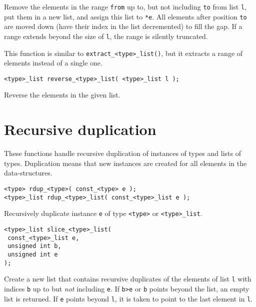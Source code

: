 \begin{desc}
Remove the elements in the range {\tt from} up to, but not including {\tt to} from list {\tt l},
put them in a new list, and assign this list to \verb'*e'.
All elements after position {\tt to} are moved down
(have their index in the list decremented) to fill the gap.
If a range extends beyond the size of {\tt l}, the range is silently
truncated.
\par
This function is similar to \verb'extract_<type>_list()', but it
extracts a range of elements instead of a single one.
\end{desc}
\begin{verbatim}
<type>_list reverse_<type>_list( <type>_list l );
\end{verbatim}
\begin{desc}
Reverse the elements in the given list.
\end{desc}
\section{Recursive duplication}
These functions handle recursive duplication of instances of types and
lists of types.
Duplication means that new instances are created for all elements
in the data-structures.
\begin{verbatim}
<type> rdup_<type>( const_<type> e );
<type>_list rdup_<type>_list( const_<type>_list e );
\end{verbatim}
\begin{desc}
Recursively duplicate instance {\tt e} of type {\tt <type>} or
{\tt <type>\_list}.
\end{desc}
\begin{verbatim}
<type>_list slice_<type>_list(
 const_<type>_list e,
 unsigned int b,
 unsigned int e
);
\end{verbatim}
\begin{desc}
Create a new list that contains recursive duplicates of the elements of
list {\tt l} with indices {\tt b} up to but {\em not} including {\tt e}.
If {\tt b>e} or {\tt b} points beyond the list,
an empty list is returned.
If {\tt e} points beyond {\tt l},
it is taken to point to the last element in {\tt l}.
\end{desc}
